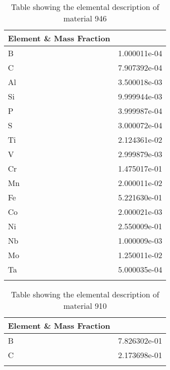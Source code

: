 \begin{centering}
\begin{longtable}[ht!]
\caption{Table showing the elemental description of material M303}
\label{table:material_M303}
\end{longtable}
\clearpage
\begin{longtable}[ht!]
{ p{} | p{} }
\hline
Element \& Mass Fraction\\
\hline
B &  1.000011e-04\\
C &  7.907392e-04\\
Al &  3.500018e-03\\
Si &  9.999944e-03\\
P &  3.999987e-04\\
S &  3.000072e-04\\
Ti &  2.124361e-02\\
V &  2.999879e-03\\
Cr &  1.475017e-01\\
Mn &  2.000011e-02\\
Fe &  5.221630e-01\\
Co &  2.000021e-03\\
Ni &  2.550009e-01\\
Nb &  1.000009e-03\\
Mo &  1.250011e-02\\
Ta &  5.000035e-04\\
\caption{Table showing the elemental description of material 946}
\label{table:material_EPPCH}
\end{longtable}
\clearpage

\begin{longtable}[ht!]
{ p{} | p{} }
\hline
Element \& Mass Fraction\\
\hline
B &  7.826302e-01\\
C &  2.173698e-01\\
\caption{Table showing the elemental description of material 910}
\label{table:material_B4C}
\end{longtable}
\clearpage


\end{centering}
